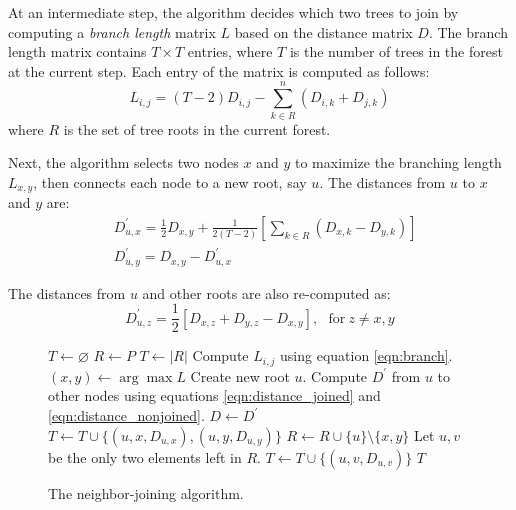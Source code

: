 \documentclass[11pt,letterpaper]{article}
\let\oldReturn\Return
\renewcommand{\Return}{\State\oldReturn}
\theoremstyle{definition}
\begin{document}
At an intermediate step, the algorithm decides which two trees to join by computing a \textit{branch length} matrix $L$ based on the distance matrix $D$. The branch length matrix contains $T \times T$ entries, where $T$ is the number of trees in the forest at the current step. Each entry of the matrix is computed as follows:  
\begin{equation}
  L_{i, j} = (T - 2) D_{i, j} - \sum_{k \in R}^n (D_{i, k} + D_{j, k})
  \label{eqn:branch}
\end{equation} where $R$ is the set of tree roots in the current forest.

Next, the algorithm selects two nodes $x$ and $y$ to maximize the branching length $L_{x, y}$, then connects each node to a new root, say $u$. The distances from $u$ to $x$ and $y$ are:  
\begin{equation}
\begin{split}
  & D_{u, x}^{'} = \frac{1}{2} D_{x, y} + \frac{1}{2(T - 2)} \left[ \sum_{k \in R} (D_{x, k} - D_{y, k}) \right] 
\\  
& D_{u, y}^{'} = D_{x, y} - D_{u, x}^{'}
\end{split}
\label{eqn:distance_joined}
\end{equation}

The distances from $u$ and other roots are also re-computed as:
\begin{equation}
  D_{u, z}^{'} = \frac{1}{2} \left[ D_{x, z} + D_{y, z} - D_{x, y} \right], \ \ \ \text{for} \ z \neq x, y
\label{eqn:distance_nonjoined}
\end{equation}

\begin{figure}[t]
  \begin{algorithmic}[1]
      \State $T \leftarrow \varnothing$ 
      \State $R \leftarrow P$
        \State $T \leftarrow |R|$
          \State Compute $L_{i, j}$ using equation \ref{eqn:branch}. 
        \EndFor
        \State $(x, y) \leftarrow \arg \max L$
        \State Create new root $u$.
        \State Compute $D^{'}$ from $u$ to other nodes using equations \ref{eqn:distance_joined} and \ref{eqn:distance_nonjoined}.
        \State $D \leftarrow D^{'}$
        \State $T \leftarrow T \cup \{(u, x, D_{u, x}), (u, y, D_{u, y})\}$
        \State $R \leftarrow R \cup \{u\} \setminus \{x, y\}$
      \EndFor
    \State Let $u, v$ be the only two elements left in $R$.
    \State $T \leftarrow T \cup \{(u, v, D_{u, v})\}$
    \Return $T$
   \EndFunction
  \end{algorithmic}
  \caption{\label{alg:nj}The neighbor-joining algorithm.}
\end{figure}
\end{document}
